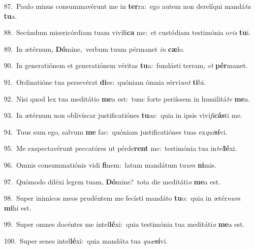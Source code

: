 {\numbfont\textcolor{\numbcolor}{87.}}~Paulo minus consummavérunt me in \textbf{ter}\-ra:~\star ego autem non derelíqui mandá\textit{ta} \textbf{tu}\-a.\par
{\numbfont\textcolor{\numbcolor}{88.}}~Secúndum misericórdiam tuam vivífi\textbf{ca} me:~\star et custódiam testimónia o\textit{ris} \textbf{tu}\-i.\par
{\numbfont\textcolor{\numbcolor}{89.}}~In ætérnum, \textbf{Dó}\-mine,~\star verbum tuum pérmanet \textit{in} \textbf{cæ}\-lo.\par
{\numbfont\textcolor{\numbcolor}{90.}}~In generatiónem et generatiónem véritas \textbf{tu}\-a:~\star fundásti terram, \textit{et} \textbf{pér}\-manet.\par
{\numbfont\textcolor{\numbcolor}{91.}}~Ordinatióne tua persevérat \textbf{di}\-es:~\star quóniam ómnia sérvi\textit{unt} \textbf{ti}\-bi.\par
{\numbfont\textcolor{\numbcolor}{92.}}~Nisi quod lex tua meditátio \textbf{me}\-a est:~\star tunc forte periíssem in humilitá\textit{te} \textbf{me}\-a.\par
{\numbfont\textcolor{\numbcolor}{93.}}~In ætérnum non oblivíscar justificatiónes \textbf{tu}\-as:~\star quia in ipsis vivi\-\textit{fi}\-\textbf{cás}ti me.\par
{\numbfont\textcolor{\numbcolor}{94.}}~Tuus sum ego, salvum \textbf{me} fac:~\star quóniam justificatiónes tuas ex\-\textit{qui}\-\textbf{sí}vi.\par
{\numbfont\textcolor{\numbcolor}{95.}}~Me exspectavérunt peccatóres ut pérde\textbf{rent} me:~\star testimónia tua in\-\textit{tel}\-\textbf{lé}xi.\par
{\numbfont\textcolor{\numbcolor}{96.}}~Omnis consummatiónis vidi \textbf{fi}\-nem:~\star latum mandátum tu\textit{um} \textbf{ni}\-mis.\par
{\numbfont\textcolor{\numbcolor}{97.}}~Quómodo diléxi legem tuam, \textbf{Dó}\-mine?~\star tota die meditáti\textit{o} \textbf{me}\-a est.\par
{\numbfont\textcolor{\numbcolor}{98.}}~Super inimícos meos prudéntem me fecísti mandáto \textbf{tu}\-o:~\star quia in ætér\textit{num} \textbf{mi}\-hi est.\par
{\numbfont\textcolor{\numbcolor}{99.}}~Super omnes docéntes me intel\-\textbf{lé}\-xi:~\star quia testimónia tua meditáti\textit{o} \textbf{me}\-a est.\par
{\numbfont\textcolor{\numbcolor}{100.}}~Super senes intel\-\textbf{lé}\-xi:~\star quia mandáta tua \textit{quæ}\-\textbf{sí}vi.\par
